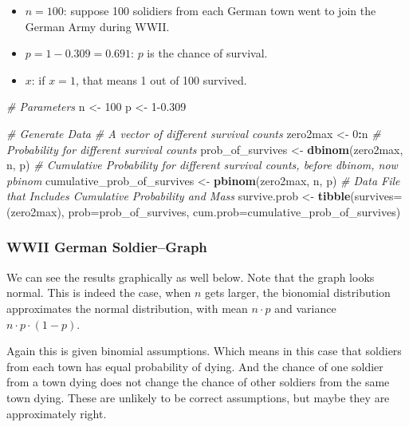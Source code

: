 \documentclass[
]{book}
\newenvironment{Shaded}{\begin{snugshade}}{\end{snugshade}}
\newcommand{\CommentTok}[1]{\textcolor[rgb]{0.56,0.35,0.01}{\textit{#1}}}
\newcommand{\DataTypeTok}[1]{\textcolor[rgb]{0.13,0.29,0.53}{#1}}
\newcommand{\DecValTok}[1]{\textcolor[rgb]{0.00,0.00,0.81}{#1}}
\newcommand{\FloatTok}[1]{\textcolor[rgb]{0.00,0.00,0.81}{#1}}
\newcommand{\KeywordTok}[1]{\textcolor[rgb]{0.13,0.29,0.53}{\textbf{#1}}}
\newcommand{\NormalTok}[1]{#1}
\newcommand{\OperatorTok}[1]{\textcolor[rgb]{0.81,0.36,0.00}{\textbf{#1}}}
\newcommand{\StringTok}[1]{\textcolor[rgb]{0.31,0.60,0.02}{#1}}
\providecommand{\tightlist}{%
  \setlength{\itemsep}{0pt}\setlength{\parskip}{0pt}}
\begin{document}
\begin{itemize}
\tightlist
\item
  \(n=100\): suppose 100 solidiers from each German town went to join the German Army during WWII.
\item
  \(p=1-0.309=0.691\): \(p\) is the chance of survival.
\item
  \(x\): if \(x=1\), that means 1 out of 100 survived.
\end{itemize}

\begin{Shaded}
\begin{Highlighting}[]
\CommentTok{\# Parameters}
\NormalTok{n \textless{}{-}}\StringTok{ }\DecValTok{100}
\NormalTok{p \textless{}{-}}\StringTok{ }\DecValTok{1}\FloatTok{{-}0.309}

\CommentTok{\# Generate Data}
\CommentTok{\# A vector of different survival counts}
\NormalTok{zero2max \textless{}{-}}\StringTok{ }\DecValTok{0}\OperatorTok{:}\NormalTok{n}
\CommentTok{\# Probability for different survival counts}
\NormalTok{prob\_of\_survives \textless{}{-}}\StringTok{ }\KeywordTok{dbinom}\NormalTok{(zero2max, n, p)}
\CommentTok{\# Cumulative Probability for different survival counts, before dbinom, now pbinom}
\NormalTok{cumulative\_prob\_of\_survives \textless{}{-}}\StringTok{ }\KeywordTok{pbinom}\NormalTok{(zero2max, n, p)}
\CommentTok{\# Data File that Includes Cumulative Probability and Mass}
\NormalTok{survive.prob \textless{}{-}}\StringTok{ }\KeywordTok{tibble}\NormalTok{(}\DataTypeTok{survives=}\NormalTok{(zero2max), }\DataTypeTok{prob=}\NormalTok{prob\_of\_survives, }\DataTypeTok{cum.prob=}\NormalTok{cumulative\_prob\_of\_survives)}
\end{Highlighting}
\end{Shaded}

\hypertarget{wwii-german-soldiergraph}{%
\subsubsection{WWII German Soldier--Graph}\label{wwii-german-soldiergraph}}

We can see the results graphically as well below. Note that the graph looks normal. This is indeed the case, when \(n\) gets larger, the bionomial distribution approximates the normal distribution, with mean \(n\cdot p\) and variance \(n \cdot p \cdot (1-p)\).

Again this is given binomial assumptions. Which means in this case that soldiers from each town has equal probability of dying. And the chance of one soldier from a town dying does not change the chance of other soldiers from the same town dying. These are unlikely to be correct assumptions, but maybe they are approximately right.
\end{document}
